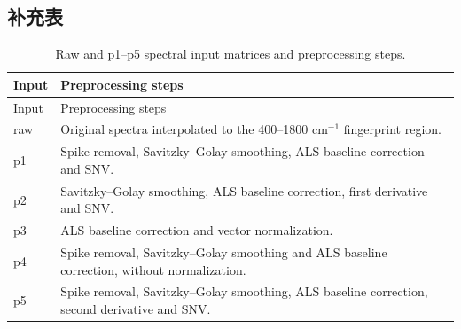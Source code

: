 \clearpage
\subsection*{补充表}


{\small
\setlength{\tabcolsep}{2.5pt}
\renewcommand{\arraystretch}{1.08}
\begin{longtable}{L{1.5cm}L{13.2cm}}
\caption{Raw and p1--p5 spectral input matrices and preprocessing steps.}\label{tab:s1_preprocessing_inputs}\\
\toprule
Input & Preprocessing steps \\
\midrule
\endfirsthead
\toprule
Input & Preprocessing steps \\
\midrule
\endhead
\endfoot
\bottomrule
\endlastfoot
raw & Original spectra interpolated to the 400--1800 cm$^{-1}$ fingerprint region. \\
p1 & Spike removal, Savitzky--Golay smoothing, ALS baseline correction and SNV. \\
p2 & Savitzky--Golay smoothing, ALS baseline correction, first derivative and SNV. \\
p3 & ALS baseline correction and vector normalization. \\
p4 & Spike removal, Savitzky--Golay smoothing and ALS baseline correction, without normalization. \\
p5 & Spike removal, Savitzky--Golay smoothing, ALS baseline correction, second derivative and SNV. \\
\end{longtable}
}


